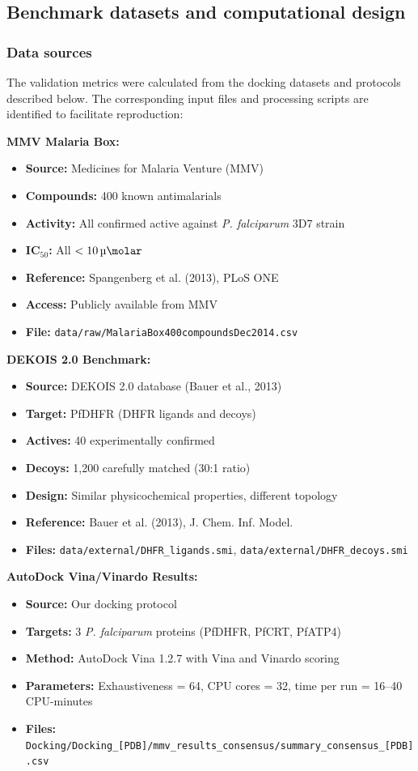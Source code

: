 \documentclass[journal=jcisd8,manuscript=suppinfo]{achemso}
\begin{document}
\subsection*{Benchmark datasets and computational design}

\subsubsection*{Data sources}

The validation metrics were calculated from the docking datasets and protocols described below. The corresponding input files and processing scripts are identified to facilitate reproduction:

\textbf{MMV Malaria Box:}
\begin{itemize}
  \item \textbf{Source:} Medicines for Malaria Venture (MMV)
  \item \textbf{Compounds:} 400 known antimalarials
  \item \textbf{Activity:} All confirmed active against \textit{P. falciparum} 3D7 strain
  \item \textbf{IC$_{50}$:} All $< \qty{10}{\micro\molar}$
  \item \textbf{Reference:} Spangenberg et al. (2013), PLoS ONE
  \item \textbf{Access:} Publicly available from MMV
  \item \textbf{File:} \texttt{data/raw/MalariaBox400compoundsDec2014.csv}
\end{itemize}

\textbf{DEKOIS 2.0 Benchmark:}
\begin{itemize}
  \item \textbf{Source:} DEKOIS 2.0 database (Bauer et al., 2013)
  \item \textbf{Target:} PfDHFR (DHFR ligands and decoys)
  \item \textbf{Actives:} 40 experimentally confirmed
  \item \textbf{Decoys:} 1,200 carefully matched (30:1 ratio)
  \item \textbf{Design:} Similar physicochemical properties, different topology
  \item \textbf{Reference:} Bauer et al. (2013), J. Chem. Inf. Model.
  \item \textbf{Files:} \texttt{data/external/DHFR\_ligands.smi}, \texttt{data/external/DHFR\_decoys.smi}
\end{itemize}

\textbf{AutoDock Vina/Vinardo Results:}
\begin{itemize}
  \item \textbf{Source:} Our docking protocol
  \item \textbf{Targets:} 3 \textit{P. falciparum} proteins (PfDHFR, PfCRT, PfATP4)
  \item \textbf{Method:} AutoDock Vina 1.2.7 with Vina and Vinardo scoring
  \item \textbf{Parameters:} Exhaustiveness = 64, CPU cores = 32, time per run = 16--40 CPU-minutes
  \item \textbf{Files:} \texttt{Docking/Docking\_[PDB]/mmv\_results\_consensus/summary\_consensus\_[PDB].csv}
\end{itemize}
\end{document}

